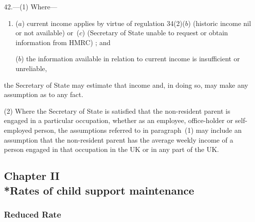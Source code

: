 \documentclass[12pt,a4paper]{article}
\begin{document}
42.---(1)  Where—
\begin{enumerate}\item[]
($a$) current income applies by virtue of 
regulation 34(2)($b$)  
(historic income 
nil or  %
not available)
or~($c$)  (Secretary of State unable to request or obtain information from HMRC)%
; and

($b$) the information available in relation to current income is insufficient or unreliable,
\end{enumerate}
the Secretary of State may estimate that income and, in doing so, may make any assumption as to any fact.

(2) Where the Secretary of State is satisfied that the non-resident parent is engaged in a particular occupation, whether as an employee, office-holder or self-employed person, the assumptions referred to in paragraph~(1) may include an assumption that the non-resident parent has the average weekly income of a person engaged in that occupation in the UK or in any part of the UK.


\subsection[Chapter II --- Rates of child support maintenance]{Chapter II\\*Rates of child support maintenance}

\renewcommand\parthead{--- Part IV Chapter II}

\subsubsection[43. Reduced Rate]{Reduced Rate}
\end{document}

